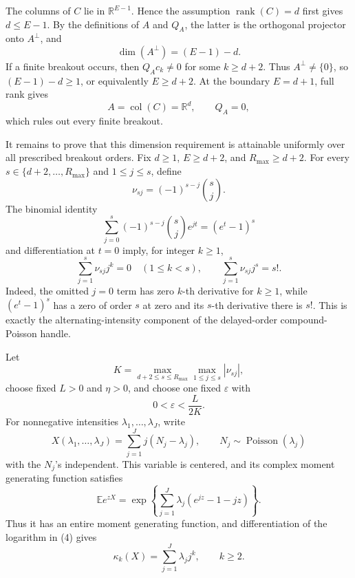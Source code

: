 The columns of \(C\) lie in \(\mathbb R^{E-1}\).  Hence the assumption \(\operatorname{rank}(C)=d\) first gives \(d\leq E-1\).  By the definitions of \(A\) and \(Q_A\), the latter is the orthogonal projector onto \(A^\perp\), and
\[
 \dim(A^\perp)=(E-1)-d.
\]
If a finite breakout occurs, then \(Q_Ac_k\neq0\) for some \(k\geq d+2\).  Thus \(A^\perp\neq\{0\}\), so \((E-1)-d\geq1\), or equivalently \(E\geq d+2\).  At the boundary \(E=d+1\), full rank gives
\[
 A=\operatorname{col}(C)=\mathbb R^d,
 \qquad
 Q_A=0,
\]
which rules out every finite breakout.

It remains to prove that this dimension requirement is attainable uniformly over all prescribed breakout orders.  Fix \(d\geq1\), \(E\geq d+2\), and \(R_{\max}\geq d+2\).  For every \(s\in\{d+2,\ldots,R_{\max}\}\) and \(1\leq j\leq s\), define
\[
 \nu_{s j}=(-1)^{s-j}{s\choose j}.
\]
The binomial identity
\[
 \sum_{j=0}^{s}(-1)^{s-j}{s\choose j}e^{jt}=(e^t-1)^s
\]
and differentiation at \(t=0\) imply, for integer \(k\geq1\),
\[
 \sum_{j=1}^{s}\nu_{s j}j^k=0\quad(1\leq k<s),
 \qquad
 \sum_{j=1}^{s}\nu_{s j}j^s=s!.
 \tag{2}
\]
Indeed, the omitted \(j=0\) term has zero \(k\)-th derivative for \(k\geq1\), while \((e^t-1)^s\) has a zero of order \(s\) at zero and its \(s\)-th derivative there is \(s!\).  This is exactly the alternating-intensity component of the delayed-order compound-Poisson handle.

Let
\[
 K=\max_{d+2\leq s\leq R_{\max}}\max_{1\leq j\leq s}|\nu_{s j}|,
\]
choose fixed \(L>0\) and \(\eta>0\), and choose one fixed \(\varepsilon\) with
\[
 0<\varepsilon<\frac{L}{2K}.
 \tag{3}
\]
For nonnegative intensities \(\lambda_1,\ldots,\lambda_J\), write
\[
 X(\lambda_1,\ldots,\lambda_J)
 =\sum_{j=1}^J j(N_j-\lambda_j),
 \qquad N_j\sim\operatorname{Poisson}(\lambda_j)
\]
with the \(N_j\)'s independent.  This variable is centered, and its complex moment generating function satisfies
\[
 \mathbb E e^{zX}
 =\exp\!\left\{\sum_{j=1}^J\lambda_j(e^{jz}-1-jz)\right\}.
 \tag{4}
\]
Thus it has an entire moment generating function, and differentiation of the logarithm in (4) gives
\[
 \kappa_k(X)=\sum_{j=1}^J\lambda_jj^k,
 \qquad k\geq2.
 \tag{5}
\]

